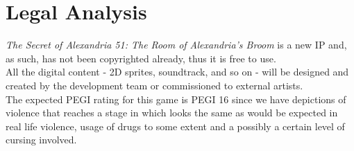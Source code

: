 \section{Legal Analysis}

\textit{The Secret of Alexandria 51: The Room of Alexandria’s Broom} is a new IP and, as such, has not been copyrighted already, thus it is free to use. \\
All the digital content - 2D sprites, soundtrack, and so on - will be designed and created by the development team or commissioned to external artists. \\
The expected PEGI rating for this game is PEGI 16 since we have depictions of violence that reaches a stage in which looks the same as would be expected in real life violence, usage of drugs to some extent and a possibly a certain level of cursing involved. \\

\pagebreak 